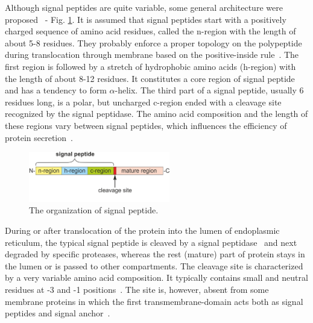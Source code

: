 \documentclass[fleqn,10pt,twoside]{gcb15submission}
\begin{document}
Although signal peptides are quite variable, some general architecture were proposed~\citep{1994izardsignal, 2013vossmechanism} - Fig. \ref{fig:sparch}. It is assumed that signal peptides start with a positively charged sequence of amino acid residues, called the n-region with the length of about 5-8 residues. They probably enforce a proper topology on the polypeptide during translocation through membrane based on the positive-inside rule~\citep{1988vonheijnetopogenic}. The first region is followed by a stretch of hydrophobic amino acids (h-region) with the length of about 8-12 residues. It constitutes a core region of signal peptide and has a tendency to form $\alpha$-helix. The third part of a signal peptide, usually 6 residues long, is a polar, but uncharged c-region ended with a cleavage site recognized by the signal peptidase. The amino acid composition and the length of these regions vary between signal peptides, which influences the efficiency of protein secretion~\citep{2006hegdethe}.

\begin{figure}[ht]\centering
\includegraphics[width=0.55\textwidth]{figures/SP.png}
\caption{The organization of signal peptide.}
\label{fig:sparch}
\end{figure}

During or after translocation of the protein into the lumen of endoplasmic reticulum, the typical signal peptide is cleaved by a signal peptidase~\citep{2002paetzelsignal} and next degraded by specific proteases, whereas the rest (mature) part of protein stays in the lumen or is passed to other compartments. The cleavage site is characterized by a very variable amino acid composition. It typically contains small and neutral residues at -3 and -1 positions~\citep{1994palzkillselection}. The site is, however, absent from some membrane proteins in which the first transmembrane-domain acts both as signal peptides and signal anchor~\citep{1988szczesnaskorupapositive}.
\end{document}

